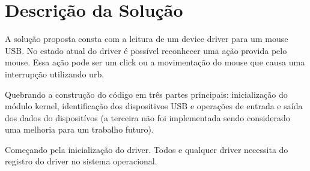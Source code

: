 
\section{Descrição da Solução}

A solução proposta consta com a leitura de um device driver para um mouse USB.
No estado atual do driver é possível reconhecer uma ação provida pelo mouse.
Essa ação pode ser um click ou a movimentação do mouse que causa uma interrupção
utilizando urb.

Quebrando a construção do código em três partes principais: inicialização do módulo
kernel, identificação dos dispositivos USB e operações de entrada e saída dos dados
do dispositívos (a terceira não foi implementada sendo considerado uma melhoria para
um trabalho futuro).

Começando pela inicialização do driver. Todos e qualquer driver necessita do registro do
driver no sistema operacional.

